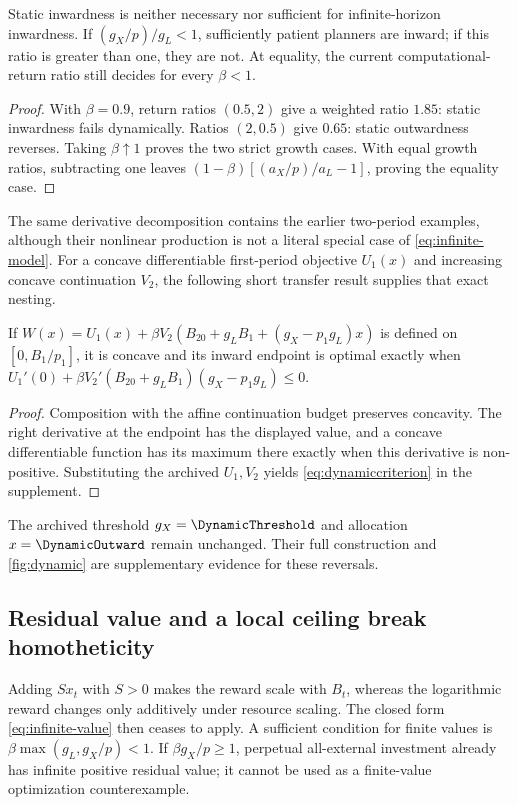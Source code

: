 \begin{corollary}
\label{cor:infinite-reversals}
Static inwardness is neither necessary nor sufficient for infinite-horizon
inwardness. If $(g_X/p)/g_L<1$, sufficiently patient planners are inward;
if this ratio is greater than one, they are not. At equality, the current
computational-return ratio still decides for every $\beta<1$.
\end{corollary}
\begin{proof}
With $\beta=0.9$, return ratios $(0.5,2)$ give a weighted ratio $1.85$:
static inwardness fails dynamically. Ratios $(2,0.5)$ give $0.65$:
static outwardness reverses. Taking $\beta\uparrow1$ proves the two
strict growth cases. With equal growth ratios, subtracting one leaves
$(1-\beta)[(a_X/p)/a_L-1]$, proving the equality case.
\end{proof}

The same derivative decomposition contains the earlier two-period
examples, although their nonlinear production is not a literal special
case of \cref{eq:infinite-model}. For a concave differentiable first-period
objective $U_1(x)$ and increasing concave continuation $V_2$, the following
short transfer result supplies that exact nesting.
\begin{corollary}
\label{prop:dynamic}
If $W(x)=U_1(x)+\beta V_2(B_{20}+g_LB_1+(g_X-p_1g_L)x)$
is defined on $[0,B_1/p_1]$, it is concave and its inward endpoint is
optimal exactly when
$U_1'(0)+\beta V_2'(B_{20}+g_LB_1)(g_X-p_1g_L)\leq0$.
\end{corollary}
\begin{proof}
Composition with the affine continuation budget preserves concavity.
The right derivative at the endpoint has the displayed value, and a
concave differentiable function has its maximum there exactly when this
derivative is non-positive. Substituting the archived $U_1,V_2$ yields
\cref{eq:dynamiccriterion} in the supplement.
\end{proof}
The archived threshold $g_X=\DynamicThreshold$ and allocation
$x=\DynamicOutward$ remain unchanged. Their full construction and
\cref{fig:dynamic} are supplementary evidence for these reversals.

\subsection{Residual value and a local ceiling break homotheticity}
Adding $Sx_t$ with $S>0$ makes the reward scale with $B_t$, whereas the
logarithmic reward changes only additively under resource scaling. The
closed form \cref{eq:infinite-value} then ceases to apply. A sufficient
condition for finite values is
$\beta\max(g_L,g_X/p)<1$. If $\beta g_X/p\geq1$, perpetual
all-external investment already has infinite positive residual value;
it cannot be used as a finite-value optimization counterexample.

